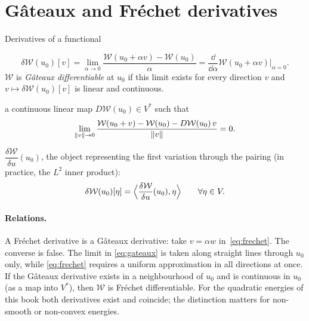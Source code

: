 \section{G\^ateaux and Fr\'echet derivatives}
\begin{gbox}{Derivatives of a functional}
%
\begin{description}[style=nextline,leftmargin=1em,font=\sffamily\bfseries]
\item[G\^ateaux (weak, directional) derivative]
\begin{equation}\label{eq:gateaux}
  \delta\mathcal W(u_0)[v]=\lim_{\alpha\to0}\frac{\mathcal W(u_0+\alpha v)-\mathcal W(u_0)}{\alpha}
  =\frac{\dd}{\dd\alpha}\mathcal W(u_0+\alpha v)\Big|_{\alpha=0} .
\end{equation}
$\mathcal W$ is \emph{G\^ateaux differentiable} at $u_0$ if this limit exists for
every direction $v$ and $v\mapsto\delta\mathcal W(u_0)[v]$ is linear and
continuous.
\item[Fr\'echet (strong) derivative]
a continuous linear map $D\mathcal W(u_0)\in V^\ast$ such that
\begin{equation}\label{eq:frechet}
  \lim_{\lVert v\rVert\to0}\frac{\mathcal W(u_0+v)-\mathcal W(u_0)-D\mathcal W(u_0)\,v}{\lVert v\rVert}=0 .
\end{equation}
\item[Functional derivative]
$\dfrac{\delta\mathcal W}{\delta u}(u_0)$, the object representing the first
variation through the pairing (in practice, the $L^2$ inner product):
\begin{equation}\label{eq:functional-derivative}
  \delta\mathcal W(u_0)[\eta]=\Bigl\langle\frac{\delta\mathcal W}{\delta u}(u_0),\eta\Bigr\rangle
  \qquad\forall\eta\in V .
\end{equation}
\end{description}
\end{gbox}

\paragraph{Relations.} A Fr\'echet derivative is a G\^ateaux derivative: take
$v=\alpha w$ in~\eqref{eq:frechet}. The converse is false. The limit in
\eqref{eq:gateaux} is taken along straight lines through $u_0$ only, while
\eqref{eq:frechet} requires a uniform approximation in all directions at
once. If the G\^ateaux derivative exists in a neighbourhood of $u_0$ and is
continuous in $u_0$ (as a map into $V^\ast$), then $\mathcal W$ is Fr\'echet
differentiable. For the quadratic energies of this book both derivatives
exist and coincide; the distinction matters for non-smooth or non-convex
energies.

